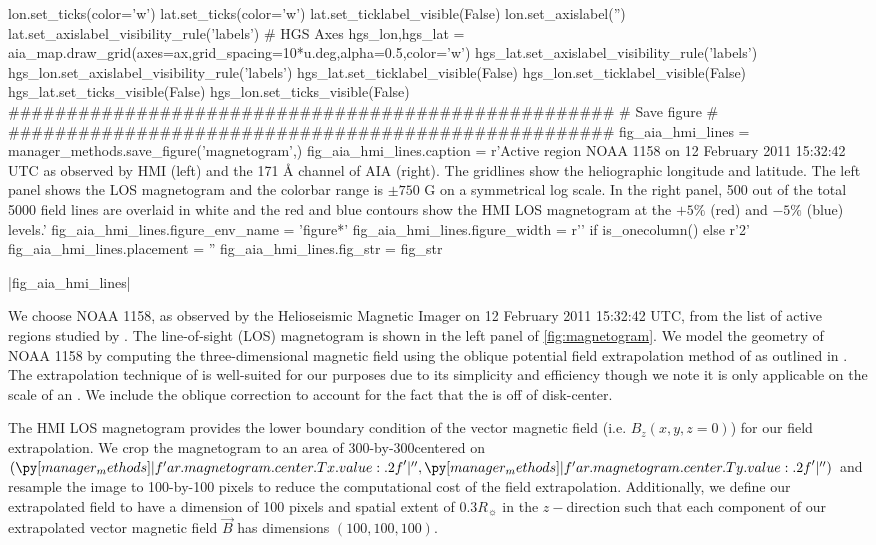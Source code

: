 \begin{pycode}
lon.set_ticks(color='w')
lat.set_ticks(color='w')
lat.set_ticklabel_visible(False)
lon.set_axislabel('')
lat.set_axislabel_visibility_rule('labels')
# HGS Axes
hgs_lon,hgs_lat = aia_map.draw_grid(axes=ax,grid_spacing=10*u.deg,alpha=0.5,color='w')
hgs_lat.set_axislabel_visibility_rule('labels')
hgs_lon.set_axislabel_visibility_rule('labels')
hgs_lat.set_ticklabel_visible(False)
hgs_lon.set_ticklabel_visible(False)
hgs_lat.set_ticks_visible(False)
hgs_lon.set_ticks_visible(False)
####################################################
#                  Save figure                     #
####################################################
fig_aia_hmi_lines = manager_methods.save_figure('magnetogram',)
fig_aia_hmi_lines.caption = r'Active region NOAA 1158 on 12 February 2011 15:32:42 UTC as observed by HMI (left) and the 171 \AA{} channel of AIA (right). The gridlines show the heliographic longitude and latitude. The left panel shows the LOS magnetogram and the colorbar range is $\pm750$ G on a symmetrical log scale. In the right panel, 500 out of the total 5000 field lines are overlaid in white and the red and blue contours show the HMI LOS magnetogram at the $+5\%$ (red) and $-5\%$ (blue) levels.'
fig_aia_hmi_lines.figure_env_name = 'figure*'
fig_aia_hmi_lines.figure_width = r'\columnwidth' if is_onecolumn() else r'2\columnwidth'
fig_aia_hmi_lines.placement = ''
fig_aia_hmi_lines.fig_str = fig_str
\end{pycode}
|fig_aia_hmi_lines|

We choose \AR{} NOAA 1158, as observed by the Helioseismic Magnetic Imager \citep[HMI,][]{scherrer_helioseismic_2012} on 12 February 2011 15:32:42 UTC, from the list of active regions studied by \citet{warren_systematic_2012}. The line-of-sight (LOS) magnetogram is shown in the left panel of \autoref{fig:magnetogram}. We model the geometry of \AR{} NOAA 1158 by computing the three-dimensional magnetic field using the oblique potential field extrapolation method of \citet{schmidt_observable_1964} as outlined in \citet[section 3]{sakurai_greens_1982}. The extrapolation technique of \citeauthor{schmidt_observable_1964} is well-suited for our purposes due to its simplicity and efficiency though we note it is only applicable on the scale of an \AR{}. We include the oblique correction to account for the fact that the \AR{} is off of disk-center.

The HMI LOS magnetogram provides the lower boundary condition of the vector magnetic field (i.e. $B_z(x,y,z=0)$) for our field extrapolation. We crop the magnetogram to an area of 300\arcsec-by-300\arcsec centered on $(\py[manager_methods]|f'{ar.magnetogram.center.Tx.value:.2f}'|\arcsec,\py[manager_methods]|f'{ar.magnetogram.center.Ty.value:.2f}'|\arcsec)$ and resample the image to 100-by-100 pixels to reduce the computational cost of the field extrapolation. Additionally, we define our extrapolated field to have a dimension of 100 pixels and spatial extent of $0.3R_{\sun}$ in the $z-$direction such that each component of our extrapolated vector magnetic field $\vec{B}$ has dimensions $(100,100,100)$.

